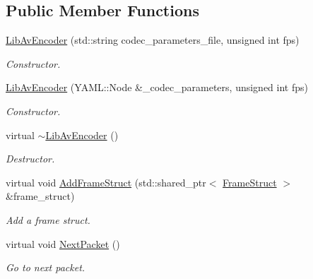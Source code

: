 \subsection*{Public Member Functions}
\begin{DoxyCompactItemize}
\item 
\hyperlink{classmoetsi_1_1ssp_1_1LibAvEncoder_a92b5b4c1f7da0a5cbf30bbf4fe7c89d4}{Lib\+Av\+Encoder} (std\+::string codec\+\_\+parameters\+\_\+file, unsigned int fps)
\begin{DoxyCompactList}\small\item\em Constructor. \end{DoxyCompactList}\item 
\hyperlink{classmoetsi_1_1ssp_1_1LibAvEncoder_a2d5ec3b4a92f7b9378fd397624bd4ea4}{Lib\+Av\+Encoder} (Y\+A\+M\+L\+::\+Node \&\+\_\+codec\+\_\+parameters, unsigned int fps)
\begin{DoxyCompactList}\small\item\em Constructor. \end{DoxyCompactList}\item 
\mbox{\label{classmoetsi_1_1ssp_1_1LibAvEncoder_aad54739bf358507ec23b25d44bb3ad4d}} 
virtual \hyperlink{classmoetsi_1_1ssp_1_1LibAvEncoder_aad54739bf358507ec23b25d44bb3ad4d}{$\sim$\+Lib\+Av\+Encoder} ()
\begin{DoxyCompactList}\small\item\em Destructor. \end{DoxyCompactList}\item 
virtual void \hyperlink{classmoetsi_1_1ssp_1_1LibAvEncoder_a931327f154e0da63fdfed73cf317d688}{Add\+Frame\+Struct} (std\+::shared\+\_\+ptr$<$ \hyperlink{structmoetsi_1_1ssp_1_1FrameStruct}{Frame\+Struct} $>$ \&frame\+\_\+struct)
\begin{DoxyCompactList}\small\item\em Add a frame struct. \end{DoxyCompactList}\item 
\mbox{\label{classmoetsi_1_1ssp_1_1LibAvEncoder_acf5e6e2f172d24778c7942c8cd37330b}} 
virtual void \hyperlink{classmoetsi_1_1ssp_1_1LibAvEncoder_acf5e6e2f172d24778c7942c8cd37330b}{Next\+Packet} ()
\begin{DoxyCompactList}\small\item\em Go to next packet. \end{DoxyCompactList}\item 

\end{DoxyCompactItemize}
